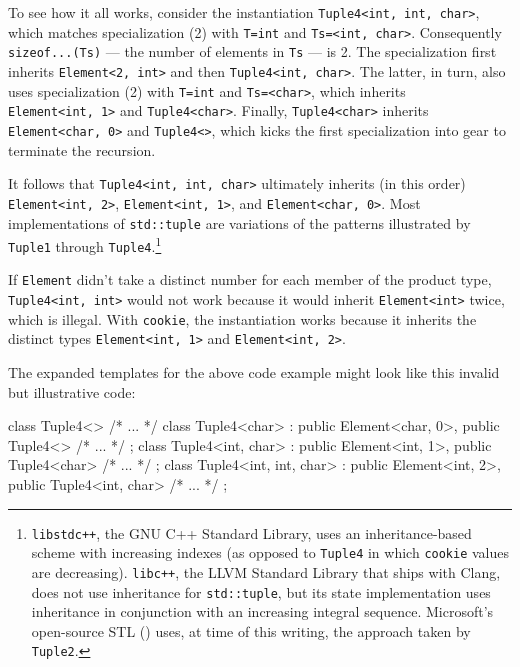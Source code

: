 \noindent To see how it all works, consider the instantiation
\lstinline!Tuple4<int,!~\lstinline!int,!~\lstinline!char>!, which matches
specialization (2) with \lstinline!T=int! and
\lstinline!Ts=<int,!~\lstinline!char>!. Consequently \lstinline!sizeof...(Ts)!
--- the number of elements in \lstinline!Ts! --- is 2. The specialization
first inherits \lstinline!Element<2,!~\lstinline!int>! and then
\lstinline!Tuple4<int,!~\lstinline!char>!. The latter, in turn, also uses
specialization (2) with \lstinline!T=int! and \lstinline!Ts=<char>!, which
inherits \lstinline!Element<int,!~\lstinline!1>! and \lstinline!Tuple4<char>!.
Finally, \lstinline!Tuple4<char>! inherits
\lstinline!Element<char,!~\lstinline!0>! and \lstinline!Tuple4<>!, which kicks
the first specialization into gear to terminate the recursion.

It follows that \lstinline!Tuple4<int,!~\lstinline!int,!~\lstinline!char>!
ultimately inherits (in this order) \lstinline!Element<int,!~\lstinline!2>!,
\lstinline!Element<int,!~\lstinline!1>!, and
\lstinline!Element<char,!~\lstinline!0>!. Most implementations of
\lstinline!std::tuple! are variations of the patterns illustrated by
\lstinline!Tuple1! through \lstinline!Tuple4!.\footnote{\lstinline!libstdc++!, the GNU C++ Standard
Library, uses an inheritance-based scheme with increasing indexes (as
opposed to \lstinline!Tuple4! in which \lstinline!cookie! values are
decreasing). \lstinline!libc++!, the LLVM Standard Library that ships with
Clang, does not use inheritance for \lstinline!std::tuple!, but its state
implementation uses inheritance in conjunction with an increasing
integral sequence. Microsoft's open-source STL
(\cite{microsoftb}) uses, at time of this writing, the
approach taken by \lstinline!Tuple2!.}

If \lstinline!Element! didn't take a distinct number for each member of the
product type,\linebreak%
 \lstinline!Tuple4<int,!~\lstinline!int>! would not work because
it would inherit \lstinline!Element<int>! twice, which is illegal. With
\lstinline!cookie!, the instantiation works because it inherits the
distinct types\linebreak%
 \lstinline!Element<int,!~\lstinline!1>! and
\lstinline!Element<int,!~\lstinline!2>!.

The expanded templates for the above code example might look like this
invalid but illustrative code:

\begin{emcppslisting}
class Tuple4<>
{ /* ... */ }
class Tuple4<char> : public Element<char, 0>, public Tuple4<>
{ /* ... */ };
class Tuple4<int, char> : public Element<int, 1>, public Tuple4<char>
{ /* ... */ };
class Tuple4<int, int, char> : public Element<int, 2>, public Tuple4<int, char>
{ /* ... */ };
\end{emcppslisting}
    

